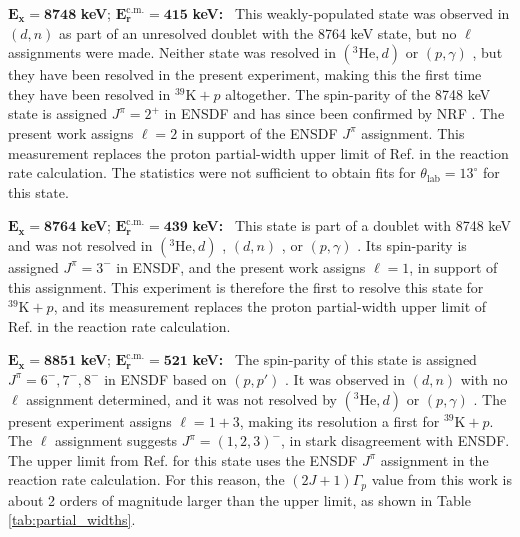 \emph{$\mathbf{E_{x} = 8748}$} \textbf{keV}; \emph{$\mathbf{E^{\boldsymbol{\mathrm{c.m.}}}_{r} = 415}$} \textbf{keV:} \, 
This weakly-populated state was observed in $(d, n)$ \cite{Fuchs1969} as part of an unresolved doublet with the 8764 keV state, but no $\ell$ assignments were made. Neither state was resolved in $(^{3}\mathrm{He},d)$ \cite{Erskine1966,Seth1967,Cage1971} or $(p,\gamma)$ \cite{Kikstra1990,Cheng1981,Leenhouts1966}, but they have been resolved in the present experiment, making this the first time they have been resolved in $^{39}\mathrm{K}+p$ altogether. The spin-parity of the 8748 keV state is assigned $J^{\pi} = 2^{+}$ in ENSDF and has since been confirmed by NRF \cite{Gribble2022}. The present work assigns $\ell=2$ in support of the ENSDF $J^{\pi}$ assignment. This measurement replaces the proton partial-width upper limit of Ref. \cite{Longland2018} in the reaction rate calculation. The statistics were not sufficient to obtain fits for $\theta_{\mathrm{lab}} = 13^{\circ}$ for this state.

\emph{$\mathbf{E_{x} = 8764}$} \textbf{keV}; \emph{$\mathbf{E^{\boldsymbol{\mathrm{c.m.}}}_{r} = 439}$} \textbf{keV:} \, 
This state is part of a doublet with 8748 keV and was not resolved in $(^{3}\mathrm{He},d)$ \cite{Erskine1966,Seth1967,Cage1971}, $(d, n)$ \cite{Fuchs1969}, or $(p,\gamma)$ \cite{Kikstra1990,Cheng1981,Leenhouts1966}. Its spin-parity is assigned $J^{\pi} = 3^{-}$ in ENSDF, and the present work assigns $\ell=1$, in support of this assignment. This experiment is therefore the first to resolve this state for $^{39}\mathrm{K}+p$, and its measurement replaces the proton partial-width upper limit of Ref. \cite{Longland2018} in the reaction rate calculation.

\emph{$\mathbf{E_{x} = 8851}$} \textbf{keV}; \emph{$\mathbf{E^{\boldsymbol{\mathrm{c.m.}}}_{r} = 521}$} \textbf{keV:} \, 
The spin-parity of this state is assigned $J^{\pi} = 6^{-}, 7^{-}, 8^{-}$ in ENSDF based on $(p, p')$ \cite{Gruhn1972}. It was observed in $(d, n)$ \cite{Fuchs1969} with no $\ell$ assignment determined, and it was not resolved by $(^{3}\mathrm{He},d)$ \cite{Erskine1966,Seth1967,Cage1971} or $(p,\gamma)$ \cite{Kikstra1990,Cheng1981,Leenhouts1966}. The present experiment assigns $\ell=1+3$, making its resolution a first for $^{39}\mathrm{K}+p$. The $\ell$ assignment suggests $J^{\pi} = (1, 2, 3)^{-}$, in stark disagreement with ENSDF. The upper limit from Ref. \cite{Longland2018} for this state uses the ENSDF $J^{\pi}$ assignment in the reaction rate calculation. For this reason, the $(2J+1)\Gamma_{p}$ value from this work is about 2 orders of magnitude larger than the upper limit, as shown in Table \ref{tab:partial_widths}.

